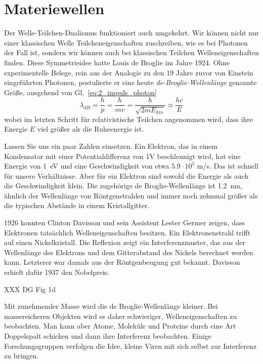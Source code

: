  \section{Materiewellen}

 Der Welle-Teilchen-Dualismus funktioniert auch umgekehrt. Wir können nicht nur einer klassischen Welle Teilcheneigenschaften zuschreiben, wie es bei Photonen der Fall ist, sondern wir können auch bei klassischen Teilchen Welleneigenschaften finden. Diese Symmetrieidee hatte Louis de Broglie im Jahre 1924. Ohne experimentelle Belege, rein aus der Analogie zu den 19 Jahre zuvor von Einstein eingeführten Photonen, postulierte er eine heute \emph{de-Broglie-Wellenlänge} genannte Größe, ausgehend von Gl.~\ref{eq:2_impuls_photon}
 \begin{equation}
     \lambda_{dB} = \frac{h}{p} = \frac{h}{m v} = \frac{h}{\sqrt{2 m E_{kin}}} \approx \frac{h c}{E}
 \end{equation}
 wobei im letzten Schritt für relativistische Teilchen angenommen wird, dass ihre Energie $E$ viel größer als die Ruheenergie ist.
 
 
 Lassen Sie uns ein paar Zahlen einsetzen. Ein Elektron, das in einem Kondensator mit einer Potentialdifferenz von \si{1}{V} beschleunigt wird, hat eine Energie von 1~eV und eine Geschwindigkeit von etwa $5.9 \cdot 10^5$ m/s. Das ist schnell für unsere Verhältnisse. Aber für ein Elektron sind sowohl die Energie als auch die Geschwindigkeit klein. Die zugehörige de Broglie-Wellenlänge ist 1.2~nm, ähnlich der Wellenlänge von Röntgenstrahlen und immer noch zehnmal größer als die typischen Abstände in einem Kristallgitter.

 1926 konnten Clinton Davisson und sein Assistent Lester Germer zeigen, dass Elektronen tatsächlich Welleneigenschaften besitzen.
 Ein Elektronenstrahl trifft auf einen Nickelkristall. Die Reflexion zeigt ein Interferenzmuster, das aus der Wellenlänge des Elektrons und dem Gitterabstand des Nickels berechnet werden kann. Letzterer war damals aus der Röntgenbeugung gut bekannt. Davisson erhielt dafür 1937 den Nobelpreis.
 
 \begin{marginfigure}
    \caption{ XXX DG Fig 1d}
\end{marginfigure}


 Mit zunehmender Masse wird die de Broglie-Wellenlänge kleiner. Bei massereicheren Objekten wird es daher schwieriger, Welleneigenschaften zu beobachten. Man kann aber Atome, Moleküle und Proteine durch eine Art Doppelspalt schicken und dann ihre Interferenz beobachten. Einige Forschungsgruppen verfolgen die Idee, kleine Viren mit sich selbst zur Interferenz zu bringen.


